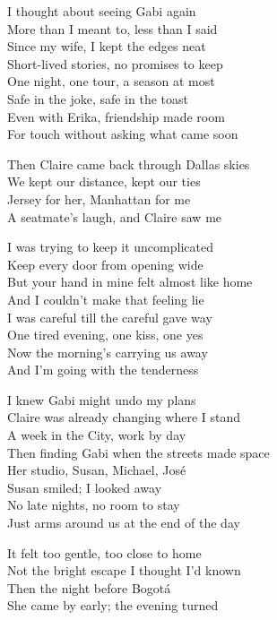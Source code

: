 \begin{lyrics}
I thought about seeing Gabi again\\
More than I meant to, less than I said\\
Since my wife, I kept the edges neat\\
Short-lived stories, no promises to keep\\
One night, one tour, a season at most\\
Safe in the joke, safe in the toast\\
Even with Erika, friendship made room\\
For touch without asking what came soon

Then Claire came back through Dallas skies\\
We kept our distance, kept our ties\\
Jersey for her, Manhattan for me\\
A seatmate’s laugh, and Claire saw me

I was trying to keep it uncomplicated\\
Keep every door from opening wide\\
But your hand in mine felt almost like home\\
And I couldn’t make that feeling lie\\
I was careful till the careful gave way\\
One tired evening, one kiss, one yes\\
Now the morning’s carrying us away\\
And I’m going with the tenderness

I knew Gabi might undo my plans\\
Claire was already changing where I stand\\
A week in the City, work by day\\
Then finding Gabi when the streets made space\\
Her studio, Susan, Michael, José\\
Susan smiled; I looked away\\
No late nights, no room to stay\\
Just arms around us at the end of the day

It felt too gentle, too close to home\\
Not the bright escape I thought I’d known\\
Then the night before Bogotá\\
She came by early; the evening turned


\end{lyrics}
